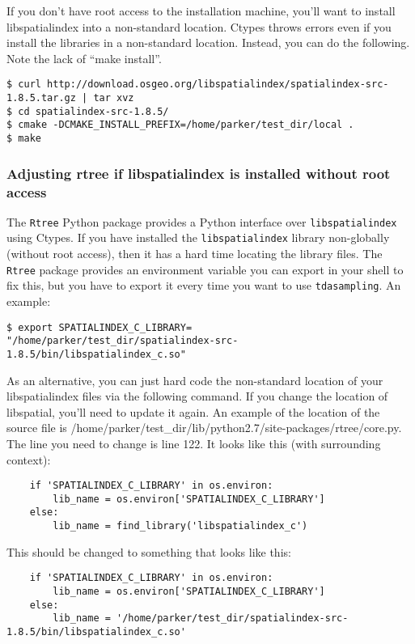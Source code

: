 \documentclass[11pt]{article}
\begin{document}
If you don't have root access to the installation machine, you'll want to install libspatialindex into a non-standard location. Ctypes throws errors even if you install the libraries in a non-standard location. Instead, you can do the following. Note the lack of ``make install''.

\begin{verbatim} 
$ curl http://download.osgeo.org/libspatialindex/spatialindex-src-1.8.5.tar.gz | tar xvz
$ cd spatialindex-src-1.8.5/
$ cmake -DCMAKE_INSTALL_PREFIX=/home/parker/test_dir/local .
$ make 
\end{verbatim} 


\subsubsection{Adjusting rtree if libspatialindex is installed without root access}
The \texttt{Rtree} Python package provides a Python interface over \texttt{libspatialindex} using Ctypes. If you have installed the \texttt{libspatialindex} library non-globally (without root access), then it has a hard time locating the library files. The \texttt{Rtree} package provides an environment variable you can export in your shell to fix this, but you have to export it every time you want to use \texttt{tdasampling}. An example: 

\begin{verbatim} 
$ export SPATIALINDEX_C_LIBRARY=
"/home/parker/test_dir/spatialindex-src-1.8.5/bin/libspatialindex_c.so"
\end{verbatim} 

As an alternative, you can just hard code the non-standard location of your libspatialindex files via the following command. If you change the location of libspatial, you'll need to update it again. An example of the location of the source file is /home/parker/test\_dir/lib/python2.7/site-packages/rtree/core.py. The line you need to change is line 122. It looks like this (with surrounding context):

\begin{verbatim} 
    if 'SPATIALINDEX_C_LIBRARY' in os.environ:
        lib_name = os.environ['SPATIALINDEX_C_LIBRARY']
    else:
        lib_name = find_library('libspatialindex_c')
\end{verbatim} 

This should be changed to something that looks like this: 

\begin{verbatim} 
    if 'SPATIALINDEX_C_LIBRARY' in os.environ:
        lib_name = os.environ['SPATIALINDEX_C_LIBRARY']
    else:
        lib_name = '/home/parker/test_dir/spatialindex-src-1.8.5/bin/libspatialindex_c.so'
\end{verbatim} 
\end{document}
